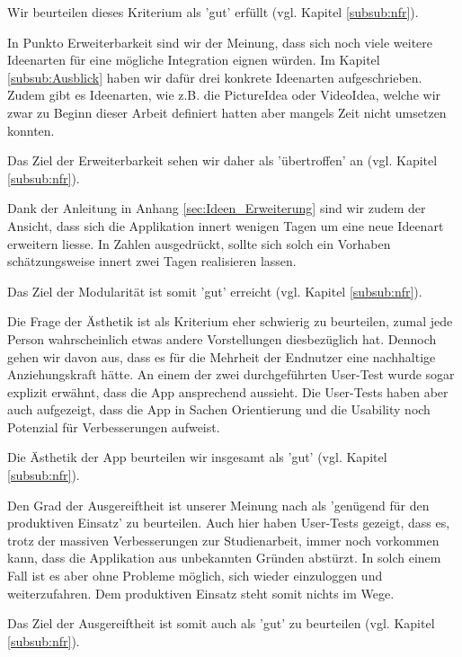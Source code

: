 Wir beurteilen dieses Kriterium als 'gut' erfüllt (vgl. Kapitel \ref{subsub:nfr}).
 
 In Punkto Erweiterbarkeit sind wir der Meinung, dass sich  noch viele weitere Ideenarten für eine mögliche Integration eignen würden. Im Kapitel \ref{subsub:Ausblick} haben wir dafür drei konkrete Ideenarten aufgeschrieben. Zudem gibt es Ideenarten, wie z.B. die PictureIdea oder VideoIdea, welche wir zwar zu Beginn dieser Arbeit definiert hatten aber mangels Zeit nicht umsetzen konnten. 
 
Das Ziel der Erweiterbarkeit sehen wir daher als 'übertroffen' an (vgl. Kapitel \ref{subsub:nfr}).

Dank der Anleitung in Anhang \ref{sec:Ideen_Erweiterung} sind wir zudem der Ansicht, dass sich die Applikation innert wenigen Tagen um eine neue Ideenart erweitern liesse. In Zahlen ausgedrückt, sollte sich solch ein Vorhaben schätzungsweise innert zwei Tagen realisieren lassen. 

Das Ziel der Modularität ist somit 'gut' erreicht (vgl. Kapitel \ref{subsub:nfr}).

Die Frage der Ästhetik ist als Kriterium eher schwierig zu beurteilen, zumal jede Person wahrscheinlich etwas andere Vorstellungen diesbezüglich hat. Dennoch gehen wir davon aus, dass es für die Mehrheit der Endnutzer eine nachhaltige Anziehungskraft hätte. An einem der zwei durchgeführten User-Test wurde sogar explizit erwähnt, dass die App ansprechend aussieht. Die User-Tests haben aber auch aufgezeigt, dass die App in Sachen Orientierung und die Usability noch Potenzial für Verbesserungen aufweist.

Die Ästhetik der App beurteilen wir insgesamt als 'gut' (vgl. Kapitel \ref{subsub:nfr}).

Den Grad der Ausgereiftheit ist unserer Meinung nach als 'genügend für den produktiven Einsatz' zu beurteilen. Auch hier haben User-Tests gezeigt, dass es, trotz der massiven Verbesserungen zur Studienarbeit, immer noch vorkommen kann, dass die Applikation aus unbekannten Gründen abstürzt. In solch einem Fall ist es aber ohne Probleme möglich, sich wieder einzuloggen und weiterzufahren. Dem produktiven Einsatz steht somit nichts im Wege.

Das Ziel der Ausgereiftheit ist somit auch als 'gut' zu beurteilen (vgl. Kapitel \ref{subsub:nfr}).

